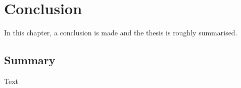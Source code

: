 \documentclass[class=scrbook, crop=false]{standalone}
\begin{document}
\chapter{Conclusion} %
\label{Chapter::Conclusion}
    In this chapter, a conclusion is made and the thesis is roughly summarised.

\section{Summary}
\label{Section::Summary}
    Text
\end{document}
